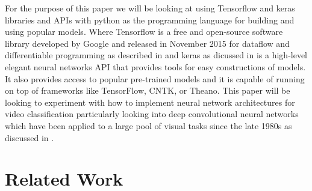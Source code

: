 \documentclass[10pt,phd,a4paper,oneside]{article}
\begin{document}
    For the purpose of this paper we will be looking at using Tensorflow and keras libraries and APIs with python as the programming language for building and using popular models.
    Where Tensorflow is a free and open-source software library developed by Google and released in November 2015 for dataflow and differentiable programming as described in \citep{8578572} and keras as dicussed in \citep{Lux:2019:OSC:3310195.3310202} is a high-level elegant neural networks API that provides tools for easy constructions of models. It also provides access to popular pre-trained models and it is capable of running on top of frameworks like TensorFlow, CNTK, or Theano.
    This paper will be looking to experiment with how to implement neural network architectures for video classification particularly looking into deep convolutional neural networks which have been applied to a large pool of visual tasks since the late 1980s as discussed in \citep{doi:10.1162neco_a_00990}.




    \section{Related Work}
\end{document}
